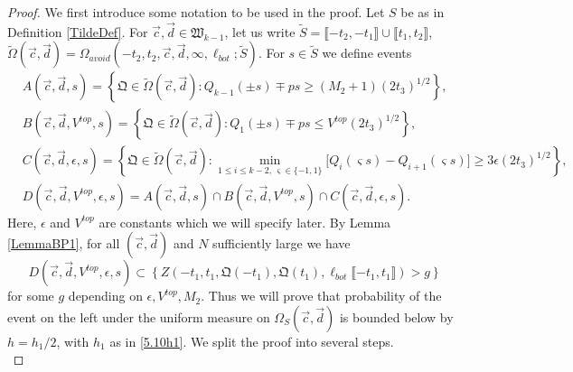 \begin{proof} We first introduce some notation to be used in the proof. Let $S$ be as in Definition \ref{TildeDef}. For $\vec{c}, \vec{d} \in \mathfrak{W}_{k-1}$, let us write $\tilde{S} = \llbracket -t_2,-t_1\rrbracket \cup \llbracket t_1,t_2\rrbracket$, $\tilde{\Omega}(\vec{c},\vec{d}) = \Omega_{avoid}(-t_2, t_2, \vec{c}, \vec{d}, \infty, \ell_{bot}; \tilde{S})$. For $s\in\tilde{S}$ we define events
	\begin{equation}
	\begin{split}
	&A(\vec{c}, \vec{d},s) = \left\{\mathfrak{Q} \in \tilde\Omega(\vec{c},\vec{d}): Q_{k-1}(\pm s) \mp ps \geq (M_2 + 1) (2t_3)^{1/2} \right\}, \\
	&B(\vec{c},\vec{d},V^{top},s) = \left\{ \mathfrak{Q} \in \tilde\Omega(\vec{c},\vec{d}): Q_{1}(\pm s) \mp ps \leq V^{top} (2t_3)^{1/2} \right\},\\
	&C(\vec{c}, \vec{d}, \epsilon, s) = \left\{ \mathfrak{Q} \in \tilde\Omega(\vec{c},\vec{d}): \min_{1\leq i\leq k-2, \, \varsigma \in \{-1, 1\}} \big[Q_{i}(\varsigma s) - Q_{i+1}(\varsigma s)\big] \geq 3\epsilon (2t_3)^{1/2} \right\},\\
	&D(\vec{c},\vec{d},V^{top},\epsilon,s) = A(\vec{c}, \vec{d},s) \cap B(\vec{c},\vec{d},V^{top},s) \cap C(\vec{c}, \vec{d}, \epsilon, s).
	\end{split}
	\end{equation}
	Here, $\epsilon$ and $V^{top}$ are constants which we will specify later. By Lemma \ref{LemmaBP1}, for all $(\vec{c},\vec{d})$ and $N$ sufficiently large we have $$D(\vec{c},\vec{d},V^{top},\epsilon,s)  \subset \left\{Z\left(  -t_1, t_1, \mathfrak{Q}(-t_1), \mathfrak{Q}(t_1), \ell_{bot}\llbracket -t_1, t_1\rrbracket\right) > g\right\}$$
	for some $g$ depending on $\epsilon,V^{top},M_2$. Thus we will prove that probability of the event on the left under the uniform measure on $\Omega_S(\vec{c},\vec{d})$ is bounded below by $h = h_1/2$, with $h_1$ as in \eqref{5.10h1}. We split the proof into several steps.\\
	

\end{proof}
